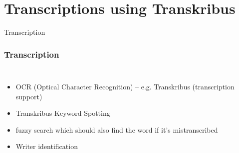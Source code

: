 \section{Transcriptions using Transkribus}



\begin{frame}{Transcription}
\subsubsection{Transcription}

\begin{columns}
\begin{itemize}\small
\item  OCR (Optical Character Recognition) -- e.g. Transkribus (transcription support)
\item  Transkribus Keyword Spotting 
\item  fuzzy search which should also find the word if it's mistranscribed
\item  Writer identification
\end{itemize}



\end{columns}
\end{frame}
